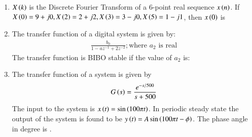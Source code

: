 \documentclass[journal,12pt,onecolumn]{IEEEtran}
\theoremstyle{remark}
\begin{document}
\begin{enumerate}
    

    \item $X\left(k\right)$ is the Discrete Fourier Transform of a 6-point real sequence $x\left(n\right)$. If $X\left(0\right) = 9+j0, X\left(2\right) = 2+j2, X\left(3\right) = 3-j0, X\left(5\right) = 1-j1$, then $x\left(0\right)$ is

    \hfill{}
        \begin{enumerate}
        \end{enumerate}

    \item The transfer function of a digital system is given by: 
    \begin{align*}
    \frac{b_0}{1 - az^{-1} + 2z^{-2}}; \text{where $a_2$ is real}
    \end{align*}
    The transfer function is BIBO stable if the value of $a_2$ is:

    \hfill{}
        \begin{enumerate}
        \end{enumerate}

    \item The transfer function of a system is given by 
    \begin{align*}
    G\left(s\right) = \frac{e^{-s/500}}{s+500}
    \end{align*}
    The input to the system is $x\left(t\right) = \sin\left(100\pi t\right)$. In periodic steady state the output of the system is found to be $y\left(t\right) = A\sin\left(100\pi t - \phi\right)$. The phase angle \brak{\phi} in degree is \underline{\hspace{2cm}}.

    \hfill{}

    
    

\end{enumerate}
\end{document}
